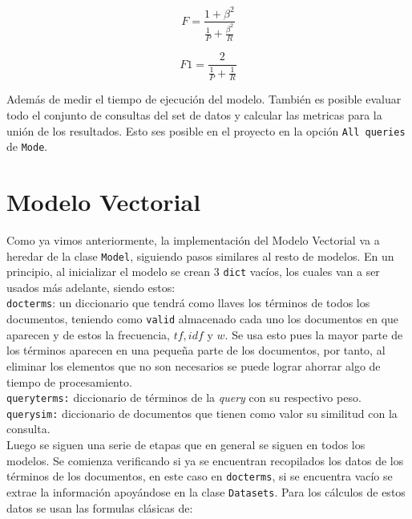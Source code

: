\documentclass[spanish]{article}
\begin{document}
		\begin{equation}
			\displaystyle F= \frac{1+\beta^2}{\frac{1}{P}+ \frac{\beta^2}{R}}
		\end{equation}

		\begin{equation}
			\displaystyle F1= \frac{2}{\frac{1}{P}+ \frac{1}{R}}
		\end{equation}

		Además de medir el tiempo de ejecución del modelo. También es posible evaluar todo el conjunto de consultas del set de datos y calcular las metricas para la unión de los resultados. Esto ses posible en el proyecto en la opción \texttt{All queries} de \texttt{Mode}.
 

	\section*{Modelo Vectorial}

		Como ya vimos anteriormente, la implementación del Modelo Vectorial va a heredar de la clase \texttt{Model}, siguiendo pasos similares al resto de modelos. En un principio, al inicializar el modelo se crean 3 \texttt{dict} vacíos, los cuales van a ser usados más adelante, siendo estos:\\

		\texttt{docterms}: un diccionario que tendrá como llaves los términos de todos los documentos, teniendo como \texttt{valid} almacenado cada uno los documentos en que aparecen y de estos la frecuencia, $ tf, idf $ y $ w $. Se usa esto pues la mayor parte de los términos aparecen en una pequeña parte de los documentos, por tanto, al eliminar los elementos que no son necesarios se puede lograr ahorrar algo de tiempo de procesamiento.\\

		\texttt{queryterms:} diccionario de términos de la \emph{query} con su respectivo peso.\\
		
		\texttt{querysim:} diccionario de documentos que tienen como valor su similitud con la consulta.\\

		Luego se siguen una serie de etapas que en general se siguen en todos los modelos. Se comienza verificando si ya se encuentran recopilados los datos de los términos de los documentos, en este caso en \texttt{docterms}, si se encuentra vacío se extrae la información apoyándose en la clase \texttt{Datasets}. Para los cálculos de estos datos se usan las formulas clásicas de:
			
\end{document}

